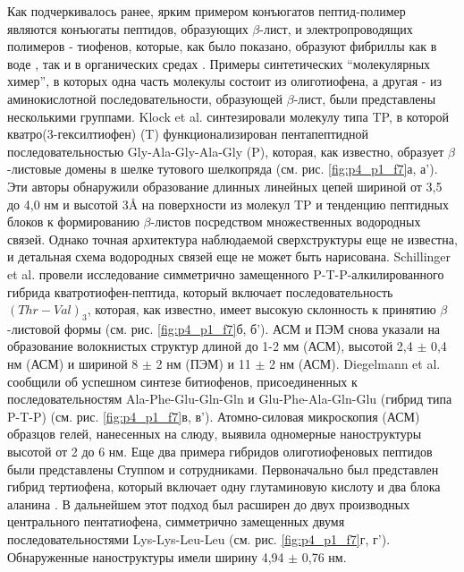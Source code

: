     Как подчеркивалось ранее, ярким примером конъюгатов пептид-полимер являются конъюгаты пептидов, образующих $\beta$-лист, и электропроводящих полимеров - тиофенов, которые, как было показано, образуют фибриллы как в воде \cite{diegelmann_one-dimensional_2008}, так и в органических средах \cite{schillinger_oligothiophene_2009}. Примеры синтетических ``молекулярных химер'', в которых одна часть молекулы состоит из олиготиофена, а другая - из аминокислотной последовательности, образующей $\beta$-лист, были представлены несколькими группами. Klock et al. \cite{klok_synthesis_2004} синтезировали молекулу типа TP, в которой кватро(3-гексилтиофен) (T) функционализирован пентапептидной последовательностью Gly-Ala-Gly-Ala-Gly (P), которая, как известно, образует $\beta$-листовые домены в шелке тутового шелкопряда (см. рис. \ref{fig:p4_p1_f7}а, а'). Эти авторы обнаружили образование длинных линейных цепей шириной от 3,5 до 4,0 нм и высотой 3\AA{} на поверхности из молекул TP и тенденцию пептидных блоков к формированию $\beta$-листов посредством множественных водородных связей. Однако точная архитектура наблюдаемой сверхструктуры еще не известна, и детальная схема водородных связей еще не может быть нарисована. Schillinger et al. \cite{schillinger_oligothiophene_2009} провели исследование симметрично замещенного P-T-P-алкилированного гибрида кватротиофен-пептида, который включает последовательность $(Thr-Val)_3$, которая, как известно, имеет высокую склонность к принятию $\beta$-листовой формы (см. рис. \ref{fig:p4_p1_f7}б, б’). АСМ и ПЭМ снова указали на образование волокнистых структур длиной до 1-2 мм (АСМ), высотой 2,4 $\pm$ 0,4 нм (АСМ) и шириной 8 $\pm$ 2 нм (ПЭМ) и 11 $\pm$ 2 нм (АСМ). Diegelmann et al. \cite{diegelmann_one-dimensional_2008} сообщили об успешном синтезе битиофенов, присоединенных к последовательностям Ala-Phe-Glu-Gln-Gln и Glu-Phe-Ala-Gln-Glu (гибрид типа P-T-P) (см. рис. \ref{fig:p4_p1_f7}в, в’). Атомно-силовая микроскопия (АСМ) образцов гелей, нанесенных на слюду, выявила одномерные наноструктуры высотой от 2 до 6 нм. Еще два примера гибридов олиготиофеновых пептидов были представлены Ступпом и сотрудниками. Первоначально был представлен гибрид тертиофена, который включает одну глутаминовую кислоту и два блока аланина \cite{tsai_self-assembly_2008}. В дальнейшем этот подход был расширен до двух производных центрального пентатиофена, симметрично замещенных двумя последовательностями Lys-Lys-Leu-Leu \cite{stone_self-assembling_2009} (см. рис. \ref{fig:p4_p1_f7}г, г’). Обнаруженные наноструктуры имели ширину 4,94 $\pm$ 0,76 нм.
    
